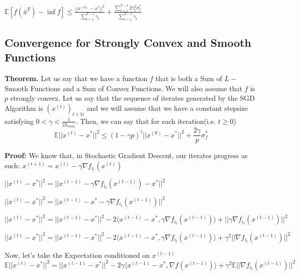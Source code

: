 $\mathbb{E} [f(\bar{x}^T) - \inf f] \leq \frac{||x^{(0)} - x^*||^2}{\sum_{t = 1}^{T - 1} \gamma_t} + \frac{\sum_{t=1}^{T - 1} 2 \gamma_t^2 \sigma_f^*}{\sum_{t = 1}^{T - 1} \gamma_t}$ \newline 

\subsection{Convergence for Strongly Convex and Smooth Functions}
\noindent \textbf{Theorem.} Let us say that we have a function $f$ that is both a Sum of $L-$Smooth Functions and a Sum of Convex Functions. We will also assume that $f$ is $p$ strongly convex. Let us say that the sequence of iterates generated by the SGD Algorithm is $(x^{(t)})_{t \in \mathbb{N}}$ and we will assume that we have a constant stepsize satisfying $0 < \gamma < \frac{1}{2L_{max}}$. Then, we can say that for each iteration(i.e. $t \geq 0$) 
\begin{equation}
    \mathbb{E}||x^{(t)} - x^*||^2 \leq (1 - \gamma p)^t ||x^{(0)} - x^*||^2 + \frac{2 \gamma}{p} \sigma_f^*
\end{equation}

\noindent \textbf{Proof:} \newline 
We know that, in Stochastic Gradient Descent, our iterates progress as such: $x^{(t + 1)}  = x^{(t)} - \gamma \nabla f_{i_t}(x^{(t)})$ \newline 

$||x^{(t)} - x^*||^2 = ||x^{(t - 1)} - \gamma \nabla f_{i_t}(x^{(t - 1)}) - x^*||^2$ \newline 

$||x^{(t)} - x^*||^2 = ||x^{(t - 1)} - x^* - \gamma \nabla f_{i_t}(x^{(t - 1)})||^2$ \newline 


$||x^{(t)} - x^*||^2 = ||x^{(t - 1)} - x^*||^2 - 2\langle x^{(t - 1)} - x^*,  \gamma \nabla f_{i_t}(x^{(t - 1)})\rangle + ||\gamma \nabla f_{i_t}(x^{(t - 1)})||^2$

$||x^{(t)} - x^*||^2 = ||x^{(t - 1)} - x^*||^2 - 2\langle x^{(t - 1)} - x^*,  \gamma \nabla f_{i_t}(x^{(t - 1)})\rangle + \gamma^2 ||\nabla f_{i_t}(x^{(t - 1)})||^2$

Now, let's take the Expectation conditioned on $x^{(t - 1)}$ \newline 
$\mathbb{E}||x^{(t)} - x^*||^2 = ||x^{(t - 1)} - x^*||^2 - 2\gamma \langle x^{(t - 1)} - x^*,  \nabla f(x^{(t - 1)})\rangle + \gamma^2 \mathbb{E} ||\nabla f_{i_t}(x^{(t - 1)})||^2$ \newline 


